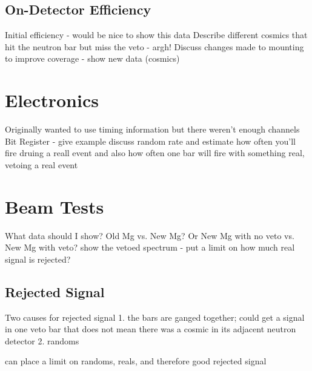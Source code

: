 \subsection{On-Detector Efficiency}
Initial efficiency - would be nice to show this data
Describe different cosmics that hit the neutron bar but miss the veto - argh!
Discuss changes made to mounting to improve coverage - show new data (cosmics)

\section{Electronics}
Originally wanted to use timing information but there weren't enough channels
Bit Register - give example
discuss random rate and estimate how often you'll fire druing a reall event and also how often one bar will fire with something real, vetoing a real event 

\section{Beam Tests}
What data should I show?  Old Mg vs. New Mg?  Or New Mg with no veto vs.  New Mg with veto?
show the vetoed spectrum - put a limit on how much real signal is rejected?

\subsection{Rejected Signal}
Two causes for rejected signal
1. the bars are ganged together; could get a signal in one veto bar that does not mean there was a cosmic in its adjacent neutron detector
2. randoms

can place a limit on randoms, reals, and therefore good rejected signal

%
% 
% 

